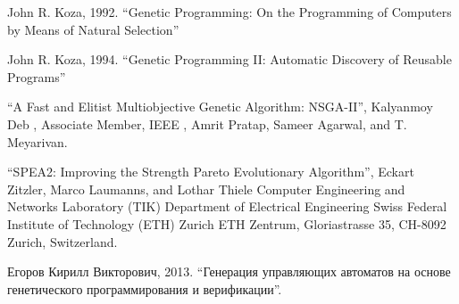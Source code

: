 \documentclass[12pt,fleqn]{article}
\begin{document}
\begin{thebibliography}{5}

John R. Koza, 1992. ``Genetic Programming: On the Programming of Computers by Means of Natural Selection''

John R. Koza, 1994. ``Genetic Programming II: Automatic Discovery of Reusable Programs''

``A Fast and Elitist Multiobjective Genetic Algorithm: NSGA-II'', Kalyanmoy Deb
, Associate Member, IEEE
, Amrit Pratap, Sameer Agarwal, and T. Meyarivan.

``SPEA2: Improving the Strength Pareto Evolutionary Algorithm'', Eckart Zitzler, Marco Laumanns, and Lothar Thiele
Computer Engineering and Networks Laboratory (TIK)
Department of Electrical Engineering
Swiss Federal Institute of Technology (ETH) Zurich
ETH Zentrum, Gloriastrasse 35, CH-8092 Zurich, Switzerland.

Егоров Кирилл Викторович, 2013. ``Генерация управляющих автоматов на основе генетического программирования и верификации''.  

\end{thebibliography}
\end{document}
